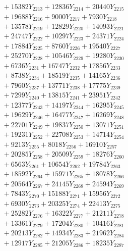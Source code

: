 \documentclass[a4paper,10pt]{article}
\begin{document}
{\begin{align}
&\;  + 15382 Y_{2213} + 12836 Y_{2214} + 20440 Y_{2215} \\[0.3ex]
&\;  + 19688 Y_{2216} + 9000 Y_{2217} + 7930 Y_{2218} \\[0.5ex]\allowbreak
&\;  + 13578 Y_{2219} + 12829 Y_{2220} + 14093 Y_{2221} \\[0.3ex]
&\;  + 24747 Y_{2222} + 10297 Y_{2223} + 24371 Y_{2224} \\[0.3ex]
&\;  + 17884 Y_{2225} + 8760 Y_{2226} + 19540 Y_{2227} \\[0.3ex]
&\;  + 25270 Y_{2228} + 10546 Y_{2229} + 19280 Y_{2230} \\[0.3ex]
&\;  + 6736 Y_{2231} + 16747 Y_{2232} + 17856 Y_{2233} \\[0.3ex]
&\;  + 8738 Y_{2234} + 18519 Y_{2235} + 14165 Y_{2236} \\[0.3ex]
&\;  + 7960 Y_{2237} + 13771 Y_{2238} + 17775 Y_{2239} \\[0.3ex]
&\;  + 7299 Y_{2240} + 13815 Y_{2241} + 23951 Y_{2242} \\[0.3ex]
&\;  + 12377 Y_{2243} + 14197 Y_{2244} + 16295 Y_{2245} \\[0.3ex]
&\;  + 19629 Y_{2246} + 16477 Y_{2247} + 16269 Y_{2248} \\[0.5ex]\allowbreak
&\;  + 22701 Y_{2249} + 19837 Y_{2250} + 13071 Y_{2251} \\[0.3ex]
&\;  + 19231 Y_{2252} + 22708 Y_{2253} + 14714 Y_{2254} \\[0.3ex]
&\;  + 9213 Y_{2255} + 8018 Y_{2256} + 16910 Y_{2257} \\[0.3ex]
&\;  + 20285 Y_{2258} + 20509 Y_{2259} + 18276 Y_{2260} \\[0.3ex]
&\;  + 6563 Y_{2261} + 10654 Y_{2262} + 19784 Y_{2263} \\[0.3ex]
&\;  + 18592 Y_{2264} + 15971 Y_{2265} + 18078 Y_{2266} \\[0.3ex]
&\;  + 20564 Y_{2267} + 24145 Y_{2268} + 24594 Y_{2269} \\[0.3ex]
&\;  + 7843 Y_{2270} + 15188 Y_{2271} + 15956 Y_{2272} \\[0.3ex]
&\;  + 6930 Y_{2273} + 20325 Y_{2274} + 22413 Y_{2275} \\[0.3ex]
&\;  + 25282 Y_{2276} + 16322 Y_{2277} + 21211 Y_{2278} \\[0.5ex]\allowbreak
&\;  + 13361 Y_{2279} + 17204 Y_{2280} + 10416 Y_{2281} \\[0.3ex]
&\;  + 20213 Y_{2282} + 14934 Y_{2283} + 21962 Y_{2284} \\[0.3ex]
&\;  + 12917 Y_{2285} + 21205 Y_{2286} + 18235 Y_{2287} \\[0.3ex]

\end{align}}
\end{document}
